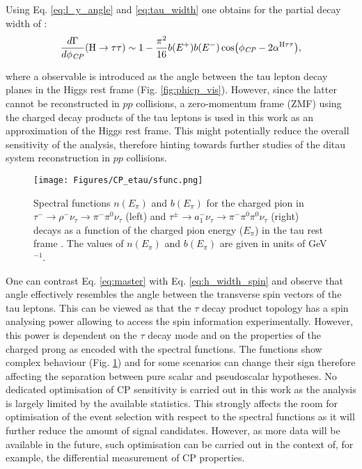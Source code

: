 Using Eq. \ref{eq:l_y_angle} and \ref{eq:tau_width} one obtains for the partial decay width of \htt:
\begin{equation}\label{eq:master}
    \dfrac{d\Gamma}{d\phi_{\textit{CP}}}(\text{H} \rightarrow \tau\tau) \sim 1 - \dfrac{\pi^2}{16}b(E^+)b(E^-)\cos(\phi_{\textit{CP}} - 2\alpha^{\text{H}\tau\tau}),
\end{equation}

where a \phicp observable is introduced as the angle between the tau lepton decay planes in the Higgs rest frame (Fig. \ref{fig:phicp_vis}). However, since the latter cannot be reconstructed in $pp$ collisions, a zero-momentum frame (ZMF) using the charged decay products of the tau leptons is used in this work as an approximation of the Higgs rest frame. This might potentially reduce the overall sensitivity of the analysis, therefore hinting towards further studies of the ditau system reconstruction in $pp$ collisions.

\begin{figure}[t!]
    \centering
    \texttt{[image: Figures/CP\_etau/sfunc.png]}
    \caption{Spectral functions $n(E_\pi)$ and $b(E_\pi)$ for the charged pion in $\tau^- \to \rho^- \nu_\tau \to \pi^-\pi^0\nu_\tau$ (left) and $\tau^\pm \to a_1^- \nu_\tau \to \pi^-\pi^0\pi^0\nu_\tau$ (right) decays as a function of the charged pion energy ($E_\pi$) in the tau rest frame \cite{Berge:2011ij}. The values of $n(E_\pi)$ and $b(E_\pi)$ are given in units of GeV$^{-1}$.}
    \label{fig:sfunc}
\end{figure}

One can contrast Eq. \ref{eq:master} with Eq. \ref{eq:h_width_spin} and observe that \phicp angle effectively resembles the angle between the transverse spin vectors of the tau leptons. This can be viewed as that the $\tau$ decay product topology has a spin analysing power allowing to access the spin information experimentally. However, this power is dependent on the $\tau$ decay mode and on the properties of the charged prong as encoded with the spectral functions. The functions show complex behaviour (Fig. \ref{fig:sfunc}) and for some scenarios can change their sign therefore affecting the separation between pure scalar and pseudoscalar hypotheses. No dedicated optimisation of CP sensitivity is carried out in this work as the analysis is largely limited by the available statistics. This strongly affects the room for optimisation of the event selection with respect to the spectral functions as it will further reduce the amount of signal candidates. However, as more data will be available in the future, such optimisation can be carried out in the context of, for example, the differential measurement of CP \htt properties.

